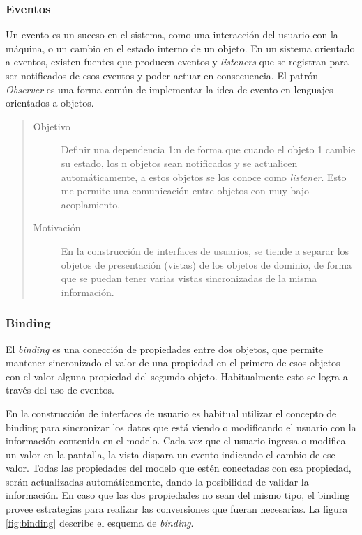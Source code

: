 \subsubsection{Eventos}
\label{Eventos}

		Un evento es un suceso en el sistema, como una interacción del usuario con
	la máquina, o un cambio en el estado interno de un objeto.
	En un sistema orientado a eventos, existen fuentes que producen eventos y
	\emph{listeners} que se registran para ser notificados de esos eventos y poder
	actuar en consecuencia.	
	El patrón \emph{Observer} \cite{Gamma1995} es una forma común de implementar la
	idea de evento en lenguajes orientados a objetos.
	
	\begin{quote}
	
	\begin{description}
	   
	\item [Objetivo] Definir una dependencia 1:n de forma que cuando el objeto
		1 cambie su estado, los n objetos sean notificados y se actualicen
		automáticamente, a estos objetos se los conoce como \emph{listener}. Esto me
		permite una comunicación entre objetos con muy bajo acoplamiento.
	
	\item [Motivación] En la construcción de interfaces de usuarios, se tiende
		a separar los objetos de presentación (vistas) de los objetos de dominio, de
		forma que se puedan tener varias vistas sincronizadas de la misma información.
	
	\end{description}
	\end{quote}
	
\subsubsection{Binding}
\label{binding}

	El \emph{binding} es una conección de propiedades entre dos objetos, que
	permite mantener sincronizado el valor de una propiedad en el primero de esos
	objetos con el valor alguna propiedad del segundo objeto.
	Habitualmente esto se logra a través del uso de eventos.
	
	En la construcción de interfaces de usuario es habitual utilizar el concepto de
	binding para sincronizar los datos que está viendo o modificando el usuario
	con la información contenida en el modelo.
	Cada vez que el usuario ingresa o modifica un valor en la pantalla, la
	vista dispara un evento indicando el cambio de ese valor. Todas las
	propiedades del modelo que estén conectadas con esa propiedad, serán
	actualizadas automáticamente, dando la posibilidad de validar la información.
	En caso que las dos propiedades no sean del mismo tipo, el binding provee
	estrategias para realizar las conversiones que fueran necesarias.
	La figura \ref{fig:binding} describe el esquema de \emph{binding}.
		
